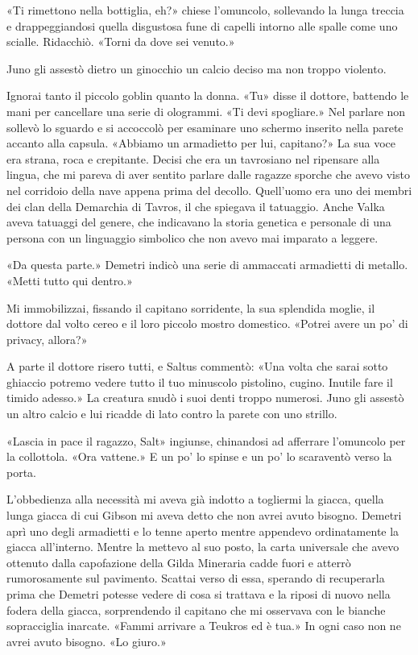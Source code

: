 «Ti rimettono nella bottiglia, eh?» chiese l'omuncolo, sollevando la
lunga treccia e drappeggiandosi quella disgustosa fune di capelli
intorno alle spalle come uno scialle. Ridacchiò. «Torni da dove sei
venuto.»

Juno gli assestò dietro un ginocchio un calcio deciso ma non troppo
violento.

Ignorai tanto il piccolo goblin quanto la donna. «Tu» disse il dottore,
battendo le mani per cancellare una serie di ologrammi. «Ti devi
spogliare.» Nel parlare non sollevò lo sguardo e si accoccolò per
esaminare uno schermo inserito nella parete accanto alla capsula.
«Abbiamo un armadietto per lui, capitano?» La sua voce era strana, roca
e crepitante. Decisi che era un tavrosiano nel ripensare alla lingua,
che mi pareva di aver sentito parlare dalle ragazze sporche che avevo
visto nel corridoio della nave appena prima del decollo. Quell'uomo era
uno dei membri dei clan della Demarchia di Tavros, il che spiegava il
tatuaggio. Anche Valka aveva tatuaggi del genere, che indicavano la
storia genetica e personale di una persona con un linguaggio simbolico
che non avevo mai imparato a leggere.

«Da questa parte.» Demetri indicò una serie di ammaccati armadietti di
metallo. «Metti tutto qui dentro.»

Mi immobilizzai, fissando il capitano sorridente, la sua splendida
moglie, il dottore dal volto cereo e il loro piccolo mostro domestico.
«Potrei avere un po' di privacy, allora?»

A parte il dottore risero tutti, e Saltus commentò: «Una volta che sarai
sotto ghiaccio potremo vedere tutto il tuo minuscolo pistolino, cugino.
Inutile fare il timido adesso.» La creatura snudò i suoi denti troppo
numerosi. Juno gli assestò un altro calcio e lui ricadde di lato contro
la parete con uno strillo.

«Lascia in pace il ragazzo, Salt» ingiunse, chinandosi ad afferrare
l'omuncolo per la collottola. «Ora vattene.» E un po' lo spinse e un po'
lo scaraventò verso la porta.

L'obbedienza alla necessità mi aveva già indotto a togliermi la giacca,
quella lunga giacca di cui Gibson mi aveva detto che non avrei avuto
bisogno. Demetri aprì uno degli armadietti e lo tenne aperto mentre
appendevo ordinatamente la giacca all'interno. Mentre la mettevo al suo
posto, la carta universale che avevo ottenuto dalla capofazione della
Gilda Mineraria cadde fuori e atterrò rumorosamente sul pavimento.
Scattai verso di essa, sperando di recuperarla prima che Demetri potesse
vedere di cosa si trattava e la riposi di nuovo nella fodera della
giacca, sorprendendo il capitano che mi osservava con le bianche
sopracciglia inarcate. «Fammi arrivare a Teukros ed è tua.» In ogni caso
non ne avrei avuto bisogno. «Lo giuro.»

